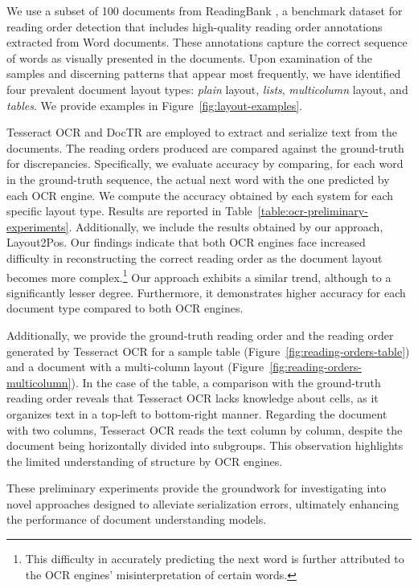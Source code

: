 We use a subset of 100 documents from ReadingBank \citep{wang2021layoutreader}, a benchmark dataset for reading order detection that includes high-quality reading order annotations extracted from Word documents. These annotations capture the correct sequence of words as visually presented in the documents. Upon examination of the samples and discerning patterns that appear most frequently, we have identified four prevalent document layout types: \textit{plain} layout, \textit{lists}, \textit{multicolumn} layout, and \textit{tables}. We provide examples in Figure~\ref{fig:layout-examples}. 

Tesseract OCR and DocTR are employed to extract and serialize text from the documents. The reading orders produced are compared against the ground-truth for discrepancies. Specifically, we evaluate accuracy by comparing, for each word in the ground-truth sequence, the actual next word with the one predicted by each \ac{OCR} engine. We compute the accuracy obtained by each system for each specific layout type. Results are reported in Table~\ref{table:ocr-preliminary-experiments}. Additionally, we include the results obtained by our approach, Layout2Pos. Our findings indicate that both \ac{OCR} engines face increased difficulty in reconstructing the correct reading order as the document layout becomes more complex.\footnote{This difficulty in accurately predicting the next word is further attributed to the \ac{OCR} engines' misinterpretation of certain words.} Our approach exhibits a similar trend, although to a significantly lesser degree. Furthermore, it demonstrates higher accuracy for each document type compared to both \ac{OCR} engines.

Additionally, we provide the ground-truth reading order and the reading order generated by Tesseract OCR for a sample table (Figure~\ref{fig:reading-orders-table}) and a document with a multi-column layout (Figure~\ref{fig:reading-orders-multicolumn}). In the case of the table, a comparison with the ground-truth reading order reveals that Tesseract OCR lacks knowledge about cells, as it organizes text in a top-left to bottom-right manner. Regarding the document with two columns, Tesseract OCR reads the text column by column, despite the document being horizontally divided into subgroups. This observation highlights the limited understanding of structure by \ac{OCR} engines. 

These preliminary experiments provide the groundwork for investigating into novel approaches designed to alleviate serialization errors, ultimately enhancing the performance of document understanding models.


